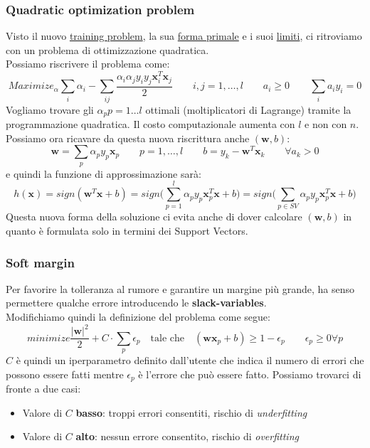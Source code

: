\subsubsection{Quadratic optimization problem}
Visto il nuovo \hyperref[def:trainingprob]{training problem}, la sua \hyperref[eq:trainprobprim]{forma primale} e i suoi \hyperref[eq:constraints]{limiti}, ci ritroviamo con un problema di ottimizzazione quadratica.\\
Possiamo riscrivere il problema come:
\begin{equation}
	Maximize_\alpha \sum_{i}\alpha_i - \sum_{ij} \frac{\alpha_i \alpha_j y_i y_j \mathbf{x}_i^T \mathbf{x}_j}{2} \quad \quad i,j = 1, \ldots, l \quad\quad a_i \geq 0 \quad\quad \sum_{i}a_iy_i=0
\end{equation}
Vogliamo trovare gli $\alpha_p p = 1\ldots l$ ottimali (moltiplicatori di Lagrange) tramite la programmazione quadratica. Il costo computazionale aumenta con $l$ e non con $n$.\\
Possiamo ora ricavare da questa nuova riscrittura anche $(\mathbf{w},b)$:
\begin{equation}
	\mathbf{w} = \sum_p \alpha_p y_p \mathbf{x}_p \quad\quad p=1, \ldots, l \quad \quad b=y_k - \mathbf{w}^T\mathbf{x}_k \quad\quad \forall a_k > 0
\end{equation}
e quindi la funzione di approssimazione sarà:
\begin{equation}
	h(\mathbf{x})=sign(\mathbf{w}^T \mathbf{x}+b) = sign\bigg(\sum_{p=1}^{l}\alpha_py_p\mathbf{x}^T_p\mathbf{x}+b\bigg) = sign \bigg(\sum_{p\in SV}\alpha_py_p\mathbf{x}^T_p\mathbf{x}+b\bigg)
\end{equation}
Questa nuova forma della soluzione ci evita anche di dover calcolare $(\mathbf{w},b)$ in quanto è formulata solo in termini dei Support Vectors.
\subsubsection{Soft margin}
Per favorire la tolleranza al rumore e garantire un margine più grande, ha senso permettere qualche errore introducendo le \textbf{slack-variables}.\\
Modifichiamo quindi la definizione del problema come segue:
\begin{equation}
	minimize \frac{\lvert \mathbf{w} \rvert ^2}{2} + C \cdot \sum_p \epsilon_p \quad \text{tale che}\quad (\mathbf{w}\mathbf{x}_p + b) \geq 1 -\epsilon_p \quad\quad \epsilon_p \geq 0 \forall p
\end{equation}
$C$ è quindi un iperparametro definito dall'utente che indica il numero di errori che possono essere fatti mentre $\epsilon_p$ è l'errore che può essere fatto. Possiamo trovarci di fronte a due casi:
\begin{itemize}
	\item Valore di $C$ \textbf{basso}: troppi errori consentiti, rischio di \textit{underfitting}
	\item Valore di $C$ \textbf{alto}: nessun errore consentito, rischio di \textit{overfitting}
\end{itemize}
